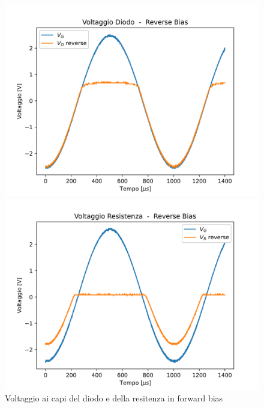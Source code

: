 \begin{figure}
    \centering
    \begin{minipage}{0.475\textwidth}
        \includegraphics[width=1\textwidth]{Diodo 3.2.(1-2)/V_D_reverse.png}
    \end{minipage}
    \hfill
    \begin{minipage}{0.475\textwidth}
        \includegraphics[width=1\textwidth]{Diodo 3.2.(1-2)/V_R_reverse.png}
    \end{minipage}
    \caption{Voltaggio ai capi del diodo e della resitenza in forward bias}
    \label{fig:raddrizzatore reverse}
\end{figure}
